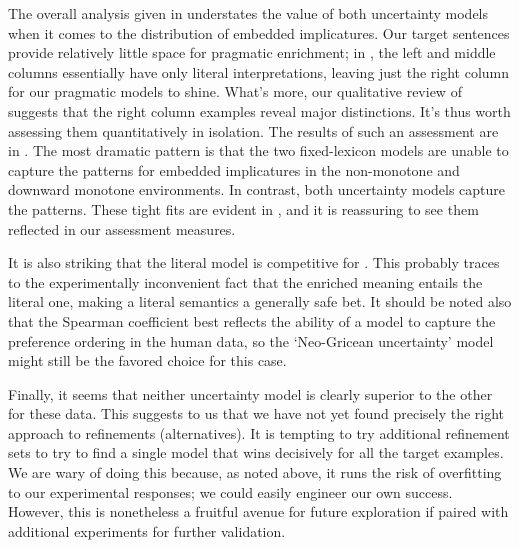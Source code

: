 \documentclass[leqno,12pt]{article}
\begin{document}
The overall analysis given in  understates the
value of both uncertainty models when it comes to the distribution of
embedded implicatures. Our target sentences provide relatively little
space for pragmatic enrichment; in , the left
and middle columns essentially have only literal interpretations,
leaving just the right column for our pragmatic models to
shine. What's more, our qualitative review of
 suggests that the right column examples
reveal major distinctions. It's thus worth assessing them
quantitatively in isolation. The results of such an assessment are in
.  The most dramatic pattern is that the two
fixed-lexicon models are unable to capture the patterns for embedded
implicatures in the non-monotone and downward monotone
environments. In contrast, both uncertainty models capture the
patterns. These tight fits are evident in ,
and it is reassuring to see them reflected in our assessment measures.

It is also striking that the literal model is competitive for
. This probably traces to the experimentally
inconvenient fact that the enriched meaning entails the literal one,
making a literal semantics a generally safe bet. It should be noted
also that the Spearman coefficient best reflects the ability of a
model to capture the preference ordering in the human data, so the
`Neo-Gricean uncertainty' model might still be the favored choice for
this case.

Finally, it seems that neither uncertainty model is clearly superior
to the other for these data.  This suggests to us that we have not yet
found precisely the right approach to refinements (alternatives). It
is tempting to try additional refinement sets to try to find a single
model that wins decisively for all the target examples. We are wary of
doing this because, as noted above, it runs the risk of overfitting to
our experimental responses; we could easily engineer our own success.
However, this is nonetheless a fruitful avenue for future exploration
if paired with additional experiments for further validation.
\end{document}
